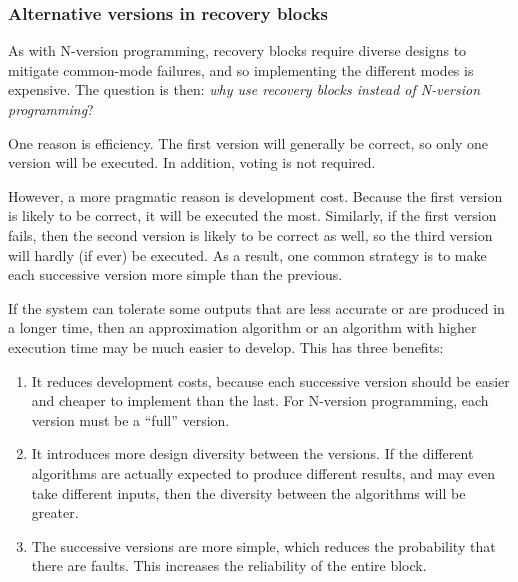 \subsubsection*{Alternative versions in recovery blocks}

As with N-version programming, recovery blocks require diverse designs to mitigate common-mode failures, and so implementing the different modes is expensive. The question is then: \emph{why use recovery blocks instead of N-version programming}?

One reason is efficiency. The first version will generally be correct, so only one version will be executed. In addition, voting is not required.

However, a more pragmatic reason is development cost. Because the first version is likely to be correct, it will be executed the most. Similarly, if the first version fails, then the second version is likely to be correct as well, so the third version will hardly (if ever) be executed. As a result, one common strategy is to make each successive version more simple than the previous.

If the system can tolerate some outputs that are less accurate or are produced in a longer time, then an approximation algorithm or an algorithm with higher execution time may be much easier to develop. This has three benefits: 

\begin{enumerate}

 \item It reduces development costs, because each successive version should be easier and cheaper to implement than the last. For N-version programming, each version must be a ``full'' version.

 \item It introduces more design diversity between the versions. If the different algorithms are actually expected to produce different results, and may even take different inputs, then the diversity between the algorithms will be greater.

 \item The successive versions are more simple, which reduces the probability that there are faults. This increases the reliability of the entire block.

\end{enumerate}

